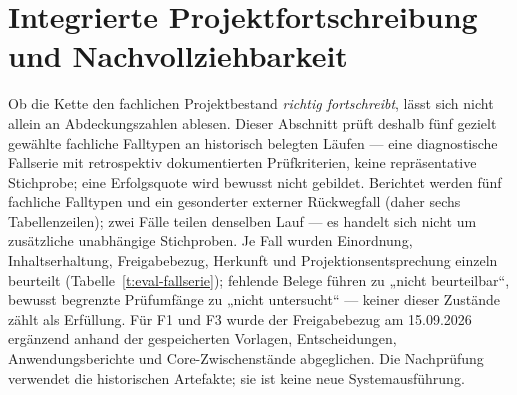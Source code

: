 
\section{Integrierte Projektfortschreibung und Nachvollziehbarkeit}
\label{sec:eval-fortschreibung}

Ob die Kette den fachlichen Projektbestand \emph{richtig fortschreibt}, lässt
sich nicht allein an Abdeckungszahlen ablesen. Dieser Abschnitt
prüft deshalb fünf gezielt gewählte fachliche Falltypen an
historisch belegten Läufen --- eine diagnostische Fallserie mit
retrospektiv dokumentierten Prüfkriterien, keine repräsentative
Stichprobe; eine Erfolgsquote wird bewusst nicht gebildet. Berichtet
werden fünf fachliche Falltypen und ein gesonderter externer
Rückwegfall (daher sechs Tabellenzeilen); zwei Fälle teilen
denselben Lauf --- es handelt sich nicht um zusätzliche
unabhängige Stichproben. Je Fall
wurden Einordnung, Inhaltserhaltung, Freigabebezug, Herkunft und
Projektionsentsprechung einzeln beurteilt
(Tabelle~\ref{t:eval-fallserie}); fehlende Belege führen zu
„nicht beurteilbar``, bewusst begrenzte Prüfumfänge zu „nicht
untersucht`` --- keiner dieser Zustände zählt als Erfüllung.
Für F1 und F3 wurde der Freigabebezug am 15.09.2026 ergänzend
anhand der gespeicherten Vorlagen, Entscheidungen, Anwendungsberichte
und Core-Zwischenstände abgeglichen. Die Nachprüfung verwendet die
historischen Artefakte; sie ist keine neue Systemausführung.

